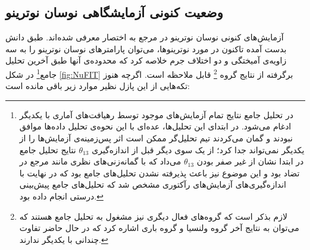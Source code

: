 \documentclass[a4paper]{book}
\begin{document}
\subsection{وضعیت کنونی آزمایشگاهی نوسان  نوترینو}
آزمایش‌های کنونی نوسان نوترینو در مرجع \cite{Denton:2022een} به اختصار معرفی شده‌اند. طبق دانش بدست آمده تاکنون در مورد نوترینوها، می‌توان پارامتر‌های نوسان نوترینو را به سه زاویه‌ی آمیختگی و دو اختلاف جرم خلاصه کرد که محدوده‌ی آنها طبق آخرین تحلیل جامع\footnote{در تحلیل جامع نتایج تمام آزمایش‌های موجود توسط رهیافت‌های آماری با یکدیگر ادغام می‌شود. در ابتدای این تحلیل‌ها، عده‌ای با این نحوه‌ی تحلیل داده‌ها موافق نبودند و گمان می‌کردند تیم تحلیل‌گر ممکن است اثر پس‌زمینه‌ی آزمایش‌ها را از یکدیگر نمی‌تواند جدا کرد؛ از یک سوی دیگر قبل از اندازه‌گیری {\footnotesize$\theta_{13}$} نتایج تحلیل جامع در ابتدا نشان از غیر صفر بودن {\footnotesize$\theta_{13}$} می‌داد که با گمانه‌زنی‌های نظری مانند مرجع \cite{Harrison:2002er} در تضاد بود و این موضوع نیز باعث پذیرفته نشدن تحلیل‌های جامع بود که در نهایت با اندازه‌گیری‌های آزمایش‌های رآکتوری مشخص شد که تحلیل‌های جامع پیش‌بینی درستی انجام داده بود.} در شکل \ref{fig:NuFIT} برگرفته از نتایج گروه \footnote{لازم بذکر است که گروه‌های فعال دیگری نیز مشغول به تحلیل جامع هستند که می‌توان به نتایج آخر گروه ولنسیا \cite{deSalas:2020pgw} و گروه باری \cite{Capozzi:2021fjo} اشاره کرد که در حال حاضر تفاوت چندانی با یکدیگر ندارند.} \cite{Esteban:2020cvm} قابل ملاحظه است. اگرچه هنوز تکه‌هایی از این پازل نظیر موارد زیر باقی مانده است:
\end{document}
